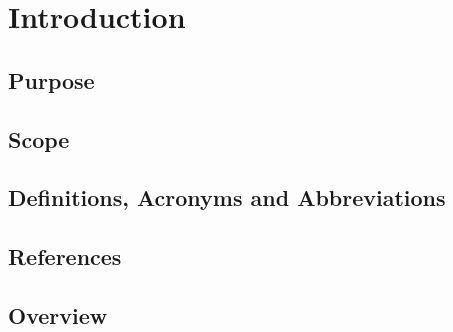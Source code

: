 \chapter{Introduction}

\section{Purpose}

\section{Scope}

\section{Definitions, Acronyms and Abbreviations}

\section{References}

\section{Overview}